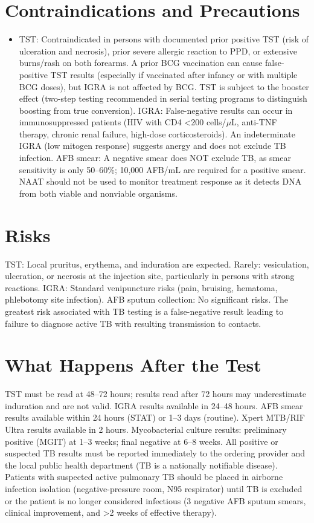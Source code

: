 \section*{Contraindications and Precautions}
\begin{itemize}
  \item TST: Contraindicated in persons with documented prior positive TST (risk of ulceration and necrosis), prior severe allergic reaction to PPD, or extensive burns/rash on both forearms. A prior BCG vaccination can cause false-positive TST results (especially if vaccinated after infancy or with multiple BCG doses), but IGRA is not affected by BCG. TST is subject to the booster effect (two-step testing recommended in serial testing programs to distinguish boosting from true conversion). IGRA: False-negative results can occur in immunosuppressed patients (HIV with CD4 <200 cells/$\mu$L, anti-TNF therapy, chronic renal failure, high-dose corticosteroids). An indeterminate IGRA (low mitogen response) suggests anergy and does not exclude TB infection. AFB smear: A negative smear does NOT exclude TB, as smear sensitivity is only 50--60\%; 10,000 AFB/mL are required for a positive smear. NAAT should not be used to monitor treatment response as it detects DNA from both viable and nonviable organisms.
\end{itemize}
\section*{Risks}
TST: Local pruritus, erythema, and induration are expected. Rarely: vesiculation, ulceration, or necrosis at the injection site, particularly in persons with strong reactions. IGRA: Standard venipuncture risks (pain, bruising, hematoma, phlebotomy site infection). AFB sputum collection: No significant risks. The greatest risk associated with TB testing is a false-negative result leading to failure to diagnose active TB with resulting transmission to contacts.

\section*{What Happens After the Test}
TST must be read at 48--72 hours; results read after 72 hours may underestimate induration and are not valid. IGRA results available in 24--48 hours. AFB smear results available within 24 hours (STAT) or 1--3 days (routine). Xpert MTB/RIF Ultra results available in 2 hours. Mycobacterial culture results: preliminary positive (MGIT) at 1--3 weeks; final negative at 6--8 weeks. All positive or suspected TB results must be reported immediately to the ordering provider and the local public health department (TB is a nationally notifiable disease). Patients with suspected active pulmonary TB should be placed in airborne infection isolation (negative-pressure room, N95 respirator) until TB is excluded or the patient is no longer considered infectious (3 negative AFB sputum smears, clinical improvement, and >2 weeks of effective therapy).

